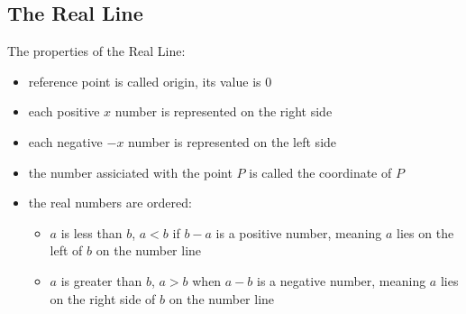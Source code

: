 \subsection{The Real Line}

The properties of the Real Line:

\begin{itemize}
    \item reference point is called origin, its value is $0$
    \item each positive $x$ number is represented on the right side
    \item each negative $-x$ number is represented on the left side
    \item the number assiciated with the point $P$ is called the coordinate of
        $P$
    \item the real numbers are ordered:
    \begin{itemize}
        \item $a$ is less than $b$,  $a < b$ if $b - a$ is a positive number,
            meaning $a$ lies on the left of $b$ on the number line
        \item $a$ is greater than $b$, $a > b$ when $a - b$ is a negative
            number, meaning $a$ lies on the right side of $b$ on the number line
    \end{itemize}
\end{itemize}

